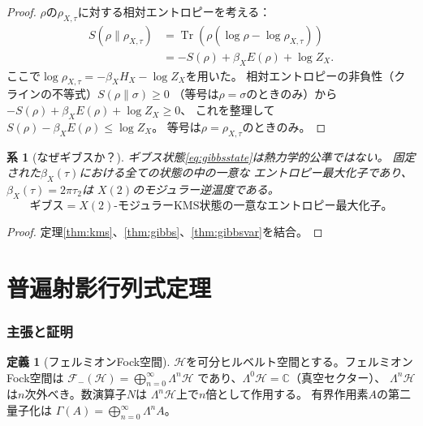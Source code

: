 \documentclass[12pt]{article}
\theoremstyle{plain}
\newtheorem{corollary}[theorem]{系}
\theoremstyle{definition}
\newtheorem{definition}[theorem]{定義}
\numberwithin{equation}{section}
\newcommand{\C}{\mathbb{C}}
\DeclareMathOperator{\Tr}{Tr}
\begin{document}
\begin{proof}
$\rho$の$\rho_{X,\tau}$に対する相対エントロピーを考える：
\begin{align}
S(\rho\|\rho_{X,\tau})
&= \Tr\!\left(\rho(\log\rho-\log\rho_{X,\tau})\right)\\
&= -S(\rho)+\beta_X E(\rho)+\log Z_X.
\end{align}
ここで$\log\rho_{X,\tau}=-\beta_X H_X-\log Z_X$を用いた。
相対エントロピーの非負性（クラインの不等式）$S(\rho\|\sigma)\geq 0$
（等号は$\rho=\sigma$のときのみ）から
$-S(\rho)+\beta_X E(\rho)+\log Z_X \geq 0$、
これを整理して$S(\rho)-\beta_X E(\rho) \leq \log Z_X$。
等号は$\rho=\rho_{X,\tau}$のときのみ。
\end{proof}

\begin{corollary}[なぜギブスか？]
ギブス状態\eqref{eq:gibbsstate}は熱力学的公準ではない。
固定された$\beta_X(\tau)$における全ての状態の中の一意な
エントロピー最大化子であり、$\beta_X(\tau)=2\pi\tau_2$は
$X(2)$のモジュラー逆温度である。
\begin{equation}
\boxed{\text{ギブス} = X(2)\text{-モジュラーKMS状態の一意なエントロピー最大化子。}}
\end{equation}
\end{corollary}

\begin{proof}
定理\ref{thm:kms}、\ref{thm:gibbs}、\ref{thm:gibbsvar}を結合。
\end{proof}


\part{普遍射影行列式定理}

\section{主張と証明}\label{sec:universal}

\begin{definition}[フェルミオンFock空間]\label{def:fock}
$\mathcal{H}$を可分ヒルベルト空間とする。フェルミオンFock空間は
$\mathcal{F}_-(\mathcal{H}) = \bigoplus_{n=0}^{\infty}\Lambda^n\mathcal{H}$
であり、$\Lambda^0\mathcal{H}=\C$（真空セクター）、
$\Lambda^n\mathcal{H}$は$n$次外べき。数演算子$N$は
$\Lambda^n\mathcal{H}$上で$n$倍として作用する。
有界作用素$A$の第二量子化は
$\Gamma(A) = \bigoplus_{n=0}^{\infty}\Lambda^n A$。
\end{definition}
\end{document}

